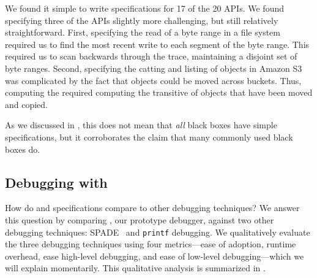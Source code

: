We found it simple to write \watprovenance{} specifications for 17 of the 20
APIs. We found specifying three of the APIs slightly more challenging, but
still relatively straightforward.
%
First, specifying the read of a byte range in a file system required us to find
the most recent write to each segment of the byte range. This required us to
scan backwards through the trace, maintaining a disjoint set of byte ranges.
%
Second, specifying the catting and listing of objects in Amazon S3 was
complicated by the fact that objects could be moved across buckets. Thus,
computing the \watprovenance{} required computing the transitive
\watprovenance{} of objects that have been moved and copied.


As we discussed in , this does not mean that
\emph{all} black boxes have simple \watprovenance{} specifications, but it
corroborates the claim that many commonly used black boxes do.



\subsection{Debugging with \WatProvenance}
How do \watprovenance{} and \watprovenance{} specifications compare to other
debugging techniques? We answer this question by comparing \fluent{}, our
prototype \watprovenance{} debugger, against two other debugging techniques:
SPADE~\cite{gehani2012spade} and \texttt{printf} debugging. We qualitatively
evaluate the three debugging techniques using four metrics---ease of adoption,
runtime overhead, ease high-level debugging, and ease of low-level
debugging---which we will explain momentarily. This qualitative analysis is
summarized in .

